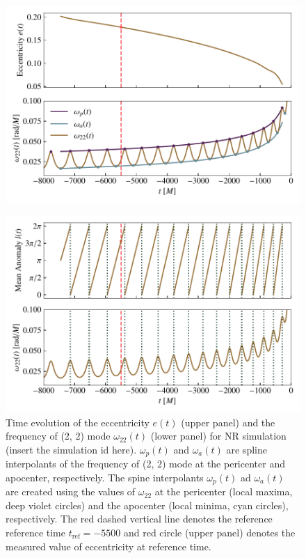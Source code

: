 \documentclass[aps,prd,amsmath,floats,floatfix, twocolumn,
superscriptaddress,nofootinbib,showpacs]{revtex4-1}
\begin{document}
\begin{figure}
  \centering
  \begin{minipage}[t]{0.475\textwidth}
    \centering
    \includegraphics[width=\columnwidth]{ecc_definition}
    \label{fig:ecc_definition}
    \caption{Time evolution of the eccentricity $e(t)$ (upper panel) and the frequency of (2, 2) mode $\omega_{22}(t)$ (lower panel) for NR simulation (insert the simulation id here).
      $\omega_p(t)$ and $\omega_a(t)$ are spline interpolants of the frequency of (2, 2) mode at the pericenter and apocenter, respectively. The spine interpolants $\omega_p(t)$ ad $\omega_a(t)$
      are created using the values of $\omega_{22}$ at the pericenter (local maxima, deep violet circles) and the apocenter (local minima, cyan circles), respectively. The red dashed vertical line
      denotes the reference reference time $t_{\text{ref}}=-5500$ and red circle (upper panel) denotes the measured value of eccentricity at reference time.}
    \end{minipage}\hfill
    \begin{minipage}[t]{0.475\textwidth}
      \centering
      \includegraphics[width=\columnwidth]{mean_ano_definition}

\end{minipage}
\end{figure}
\end{document}
